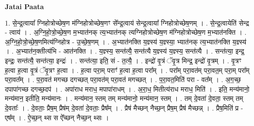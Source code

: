 \documentclass[17pt]{extarticle}
\begin{document}
\textbf{Jatai Paata} \newline

1. से॒न्द्र॒त्वाया᳚ ग्निहोत्रोच्छेष॒ण म॑ग्निहोत्रोच्छेष॒णꣳ से᳚न्द्र॒त्वाय॑ सेन्द्र॒त्वाया᳚ ग्निहोत्रोच्छेष॒णम् । . से॒न्द्र॒त्वायेति॑ सेन्द्र - त्वाय॑ । . अ॒ग्नि॒हो॒त्रो॒च्छे॒ष॒ण म॒भ्यात॑नक् त्य॒भ्यात॑नक् त्यग्निहोत्रोच्छेष॒ण म॑ग्निहोत्रोच्छेष॒ण म॒भ्यात॑नक्ति । . अ॒ग्नि॒हो॒त्रो॒च्छे॒ष॒णमित्य॑ग्निहोत्र - उ॒च्छे॒ष॒णम् । . अ॒भ्यात॑नक्ति य॒ज्ञ्स्य॑ य॒ज्ञ्स्या॒ भ्यात॑नक् त्य॒भ्यात॑नक्ति य॒ज्ञ्स्य॑ । . अ॒भ्यात॑न॒क्तीत्य॑भि - आत॑नक्ति । . य॒ज्ञ्स्य॒ सन्त॑त्यै॒ सन्त॑त्यै य॒ज्ञ्स्य॑ य॒ज्ञ्स्य॒ सन्त॑त्यै । . सन्त॑त्या॒ इन्द्र॒ इन्द्रः॒ सन्त॑त्यै॒ सन्त॑त्या॒ इन्द्रः॑ । . सन्त॑त्या॒ इति॒ सं - त॒त्यै॒ । . इन्द्रो॑ वृ॒त्रं ॅवृ॒त्र मिन्द्र॒ इन्द्रो॑ वृ॒त्रम् । . वृ॒त्रꣳ ह॒त्वा ह॒त्वा वृ॒त्रं ॅवृ॒त्रꣳ ह॒त्वा । . ह॒त्वा परा॒म् पराꣳ॑ ह॒त्वा ह॒त्वा परा᳚म् । . परा᳚म् परा॒वत॑म् परा॒वत॒म् परा॒म् परा᳚म् परा॒वत᳚म् । . प॒रा॒वत॑ मगच्छ दगच्छत् परा॒वत॑म् परा॒वत॑ मगच्छत् । . प॒रा॒वत॒मिति॑ परा - वत᳚म् । . अ॒ग॒च्छ॒ दपापा॑गच्छ दगच्छ॒दप॑ । . अपा॑राध मराध॒ मपापा॑राधम् । . अ॒रा॒ध॒ मितीत्य॑राध मराध॒ मिति॑ । . इति॒ मन्य॑मानो॒ मन्य॑मान॒ इतीति॒ मन्य॑मानः । . मन्य॑मान॒ स्तम् तम् मन्य॑मानो॒ मन्य॑मान॒ स्तम् । . तम् दे॒वता॑ दे॒वता॒ स्तम् तम् दे॒वताः᳚ । . दे॒वताः॒ प्रैष॒म् प्रैष॑म् दे॒वता॑ दे॒वताः॒ प्रैष᳚म् । . प्रैष॑ मैच्छन् नैच्छ॒न् प्रैष॒म् प्रैष॑ मैच्छन्न् । . प्रैष॒मिति॑ प्र - एष᳚म् । . ऐ॒च्छ॒न् थ्स स ऐ᳚च्छन् नैच्छ॒न् थ्सः । \newline
\end{document}
